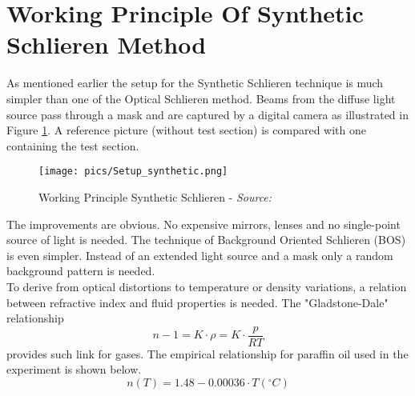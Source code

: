 \section{Working Principle Of Synthetic Schlieren Method}

As mentioned earlier the setup for the Synthetic Schlieren technique is much simpler than one of the Optical Schlieren method. Beams from the diffuse light source pass through a mask and are captured by a digital camera as illustrated in Figure \ref{pic:Setup_synthetic}. A reference picture (without test section) is compared with one containing the test section.
\begin{figure}[H]
\texttt{[image: pics/Setup\_synthetic.png]}
\caption{Working Principle Synthetic Schlieren - \emph{Source:} \cite{thomas2009synthetic}}
\label{pic:Setup_synthetic}
\end{figure}
The improvements are obvious. No expensive mirrors, lenses and no single-point source of light is needed. The technique of Background Oriented Schlieren (BOS) is even simpler. Instead of an extended light source and a mask only a random background pattern is needed.\\
To derive from optical distortions to temperature or density variations, a relation between refractive index and fluid properties is needed. The "Gladstone-Dale" relationship 
\begin{equation}
n-1 = K \cdot \rho = K \cdot \frac{p}{RT}
\end{equation}
provides such link for gases. The empirical relationship for paraffin oil used in the experiment is shown below.
\begin{equation}
n(T)= 1.48-0.00036 \cdot T(^\circ C)
\label{eq:nparafin}
\end{equation}


